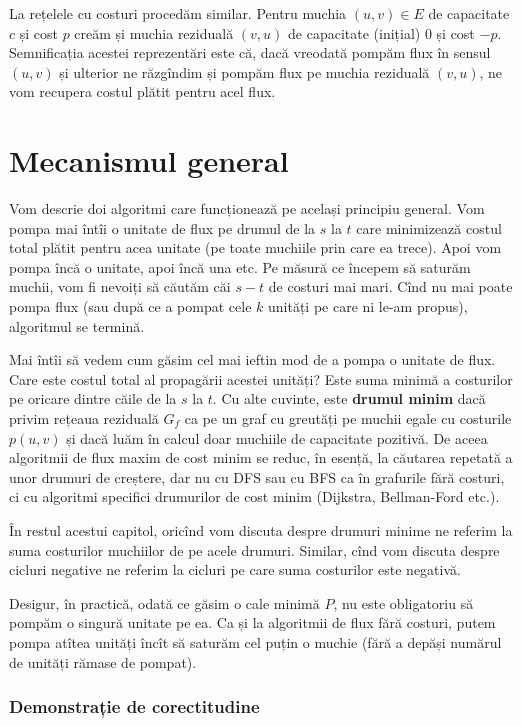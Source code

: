 \documentclass[../main.tex]{subfiles}
\begin{document}
La rețelele cu costuri procedăm similar. Pentru muchia $(u, v) \in E$ de capacitate $c$ și cost $p$ creăm și muchia reziduală $(v, u)$ de capacitate (inițial) 0 și cost $-p$. Semnificația acestei reprezentări este că, dacă vreodată pompăm flux în sensul $(u, v)$ și ulterior ne răzgîndim și pompăm flux pe muchia reziduală $(v, u)$, ne vom recupera costul plătit pentru acel flux.


\section{Mecanismul general}

Vom descrie doi algoritmi care funcționează pe același principiu general. Vom pompa mai întîi o unitate de flux pe drumul de la $s$ la $t$ care minimizează costul total plătit pentru acea unitate (pe toate muchiile prin care ea trece). Apoi vom pompa încă o unitate, apoi încă una etc. Pe măsură ce începem să saturăm muchii, vom fi nevoiți să căutăm căi $s-t$ de costuri mai mari. Cînd nu mai poate pompa flux (sau după ce a pompat cele $k$ unități pe care ni le-am propus), algoritmul se termină.

Mai întîi să vedem cum găsim cel mai ieftin mod de a pompa o unitate de flux. Care este costul total al propagării acestei unități? Este suma minimă a costurilor pe oricare dintre căile de la $s$ la $t$. Cu alte cuvinte, este \textbf{drumul minim} dacă privim rețeaua reziduală $G_f$ ca pe un graf cu greutăți pe muchii egale cu costurile $p(u, v)$ și dacă luăm în calcul doar muchiile de capacitate pozitivă. De aceea algoritmii de flux maxim de cost minim se reduc, în esență, la căutarea repetată a unor drumuri de creștere, dar nu cu DFS sau cu BFS ca în grafurile fără costuri, ci cu algoritmi specifici drumurilor de cost minim (Dijkstra, Bellman-Ford etc.).

În restul acestui capitol, oricînd vom discuta despre drumuri minime ne referim la suma costurilor muchiilor de pe acele drumuri. Similar, cînd vom discuta despre cicluri negative ne referim la cicluri pe care suma costurilor este negativă.

Desigur, în practică, odată ce găsim o cale minimă $P$, nu este obligatoriu să pompăm o singură unitate pe ea. Ca și la algoritmii de flux fără costuri, putem pompa atîtea unități încît să saturăm cel puțin o muchie (fără a depăși numărul de unități rămase de pompat).


\subsubsection*{Demonstrație de corectitudine}
\end{document}
